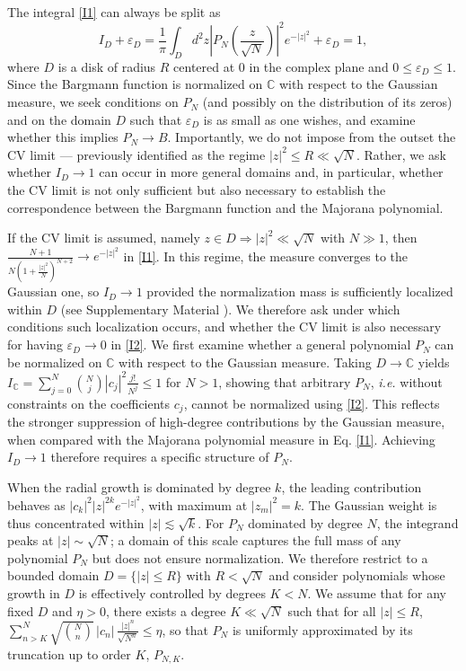 \documentclass[aps,prl,showpacs,twocolumn]{revtex4-2}
\providecommand{\abs}[1]{\left\lvert#1\right\rvert}
\providecommand{\abs}[1]{\left\lvert#1\right\rvert}
\providecommand{\abs}[1]{\left\lvert#1\right\rvert}
\providecommand{\abs}[1]{\left\lvert#1\right\rvert}
\begin{document}
The integral \eqref{I1} can always be split as
\begin{equation}\label{I2}
I_D+\varepsilon_D= \frac{1}{\pi} \int_{D} d^2 z \abs{P_N \left (\frac{z}{\sqrt{N}}\right )}^2 e^{-\abs{z}^2}+\varepsilon_D=1,
\end{equation}
where $D$ is a disk of radius $R$ centered at $0$ in the complex plane and $0 \leq \varepsilon_D \leq 1$. Since the Bargmann function is normalized on $\mathbb{C}$ with respect to the Gaussian measure, we seek conditions on $P_N$ (and possibly on the distribution of its zeros) and on the domain $D$ such that $\varepsilon_D$ is as small as one wishes, and examine whether this implies $P_N \to B$. Importantly, we do not impose from the outset the CV limit — previously identified as the regime $|z|^2 \le R \ll \sqrt{N}$. Rather, we ask whether $I_D \to 1$ can occur in more general domains and, in particular, whether the CV limit is not only sufficient but also necessary to establish the correspondence between the Bargmann function and the Majorana polynomial.



If the CV limit is assumed, namely $z \in D \Rightarrow |z|^2 \ll \sqrt{N}$ with $N \gg 1$, then $\frac{N+1}{N\left(1+\frac{|z|^2}{N}\right)^{N+2}} \to e^{-|z|^2}$ in \eqref{I1}. In this regime, the measure converges to the Gaussian one, so $I_D \to 1$ provided the normalization mass is sufficiently localized within $D$ (see Supplementary Material \cite{SM}). We therefore ask under which conditions such localization occurs, and whether the CV limit is also necessary for having $\varepsilon_D \to 0$ in \eqref{I2}. We first examine whether a general polynomial $P_N$ can be normalized on $\mathbb{C}$ with respect to the Gaussian measure. Taking $D \to \mathbb{C}$ yields $I_{\mathbb{C}} = \sum_{j=0}^N \binom{N}{j} |c_j|^2 \frac{j!}{N^j} \leq 1$ for $N>1$, showing that arbitrary $P_N$, \textit{i.e.} without constraints on the coefficients $c_j$, cannot be normalized using \eqref{I2}. This reflects the stronger suppression of high-degree contributions by the Gaussian measure, when compared with the Majorana polynomial measure in Eq. \eqref{I1}. Achieving $I_D \to 1$ therefore requires a specific structure of $P_N$.

When the radial growth is dominated by degree $k$, the leading contribution behaves as $|c_k|^2 |z|^{2k} e^{-|z|^2}$, with maximum at $|z_m|^2 = k$. The Gaussian weight is thus concentrated within $|z|\lesssim \sqrt{k}$. For $P_N$ dominated by degree $N$, the integrand peaks at $|z|\sim \sqrt{N}$; a domain of this scale captures the full mass of any polynomial $P_N$ but does not ensure normalization. We therefore restrict to a bounded domain $D=\{|z|\le R\}$ with $R<\sqrt{N}$ and consider polynomials whose growth in $D$ is effectively controlled by degrees $K < N$. We assume that for any fixed $D$ and $\eta>0$, there exists a degree $K \ll \sqrt{N}$ such that for all $|z|\le R$, $\sum_{n>K}^{N}\sqrt{\binom{N}{n}}\,|c_n|\,\frac{|z|^n}{\sqrt{N^n}} \le \eta$, so that $P_N$ is uniformly approximated by its truncation up to order $K$, $P_{N,K}$.
\end{document}
